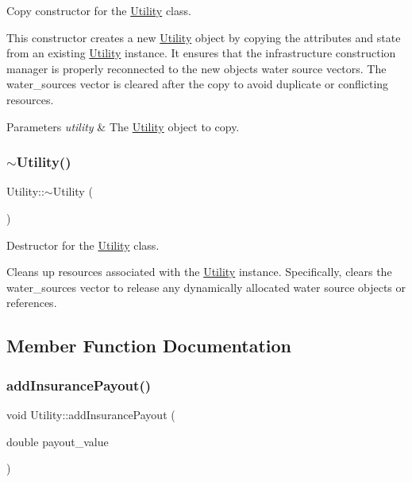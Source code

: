 Copy constructor for the \mbox{\hyperlink{classUtility}{Utility}} class. 

This constructor creates a new \mbox{\hyperlink{classUtility}{Utility}} object by copying the attributes and state from an existing \mbox{\hyperlink{classUtility}{Utility}} instance. It ensures that the infrastructure construction manager is properly reconnected to the new object\textquotesingle{}s water source vectors. The water\+\_\+sources vector is cleared after the copy to avoid duplicate or conflicting resources.


\begin{DoxyParams}{Parameters}
{\em utility} & The \mbox{\hyperlink{classUtility}{Utility}} object to copy. \\
\hline
\end{DoxyParams}
\mbox{\label{classUtility_aecfe4b31e39b00555158a2d8288b874a}} 
\subsubsection{\texorpdfstring{$\sim$\+Utility()}{~Utility()}}
{\footnotesize\ttfamily Utility\+::$\sim$\+Utility (\begin{DoxyParamCaption}{ }\end{DoxyParamCaption})}



Destructor for the \mbox{\hyperlink{classUtility}{Utility}} class. 

Cleans up resources associated with the \mbox{\hyperlink{classUtility}{Utility}} instance. Specifically, clears the water\+\_\+sources vector to release any dynamically allocated water source objects or references. 

\subsection{Member Function Documentation}
\mbox{\label{classUtility_a2eaf70b4492ab8ec0e0420d6b7c3b821}} 
\subsubsection{\texorpdfstring{add\+Insurance\+Payout()}{addInsurancePayout()}}
{\footnotesize\ttfamily void Utility\+::add\+Insurance\+Payout (\begin{DoxyParamCaption}\item[{double}]{payout\+\_\+value }\end{DoxyParamCaption})}




